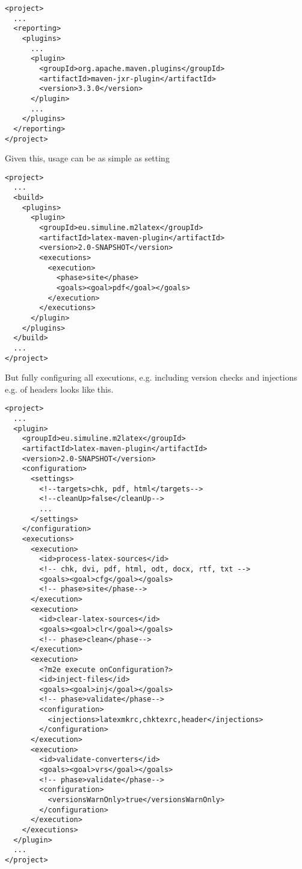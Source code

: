 \documentclass[a4paper,notumble,10pt,english]{leaflet}%
\begin{document}
\begin{Verbatim}[fontsize=\scriptsize]
<project>
  ...
  <reporting>
    <plugins>
      ...
      <plugin>
        <groupId>org.apache.maven.plugins</groupId>
        <artifactId>maven-jxr-plugin</artifactId>
        <version>3.3.0</version>
      </plugin>
      ...
    </plugins>
  </reporting>
</project>
\end{Verbatim}

  Given this, usage can be as simple as setting 


  
\begin{Verbatim}[fontsize=\scriptsize]
<project>
  ...
  <build>
    <plugins>
      <plugin>
        <groupId>eu.simuline.m2latex</groupId>
        <artifactId>latex-maven-plugin</artifactId>
        <version>2.0-SNAPSHOT</version>
        <executions>
          <execution>
            <phase>site</phase>
            <goals><goal>pdf</goal></goals>
          </execution>
        </executions>
      </plugin>
    </plugins>
  </build>
  ...
</project>
\end{Verbatim}


But fully configuring all executions, 
e.g. including version checks and injections 
e.g. of headers looks like this. 


\begin{Verbatim}[fontsize=\scriptsize]
<project>
  ...
  <plugin>
    <groupId>eu.simuline.m2latex</groupId>
    <artifactId>latex-maven-plugin</artifactId>
    <version>2.0-SNAPSHOT</version>
    <configuration>
      <settings>
        <!--targets>chk, pdf, html</targets-->
        <!--cleanUp>false</cleanUp-->
        ...
      </settings>
    </configuration>
    <executions>
      <execution>
        <id>process-latex-sources</id>
        <!-- chk, dvi, pdf, html, odt, docx, rtf, txt -->
        <goals><goal>cfg</goal></goals>
        <!-- phase>site</phase-->
      </execution>
      <execution>
        <id>clear-latex-sources</id>
        <goals><goal>clr</goal></goals>
        <!-- phase>clean</phase-->
      </execution>
      <execution>
        <?m2e execute onConfiguration?>
        <id>inject-files</id>
        <goals><goal>inj</goal></goals>
        <!-- phase>validate</phase-->
        <configuration>
          <injections>latexmkrc,chktexrc,header</injections>
        </configuration>
      </execution>
      <execution>
        <id>validate-converters</id>
        <goals><goal>vrs</goal></goals>
        <!-- phase>validate</phase-->
        <configuration>
          <versionsWarnOnly>true</versionsWarnOnly>
        </configuration>
      </execution>
    </executions>
  </plugin>
  ...
</project>
\end{Verbatim}
\end{document}
